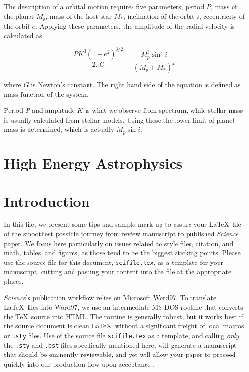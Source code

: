 \documentclass[12pt]{article}
\begin{document}
The description of a orbital motion requires five parameters, period $P$, mass of the planet $M_p$, mass of the host star $M_*$, inclination of the orbit $i$, eccentricity of the orbit $e$. Applying these parameters, the amplitude of the radial velocity is calculated as

\begin{equation}
\frac{P K^3(1-e^2)^{3/2}}{2\pi G} = \frac{M_p^3\sin^3 i}{(M_p+M_*)^2},
\end{equation}

where $G$ is Newton's constant. The right hand side of the equation is defined as mass function of the system.\cite{2013pss3.book..489W}

Period $P$ and amplitude $K$ is what we observe from spectrum, while stellar mass is usually calculated from stellar models. Using these the lower limit of planet mass is determined, which is actually $M_p\sin i$.


\section*{High Energy Astrophysics}













\section*{Introduction}

In this file, we present some tips and sample mark-up to assure your
\LaTeX\ file of the smoothest possible journey from review manuscript
to published {\it Science\/} paper.  We focus here particularly on
issues related to style files, citation, and math, tables, and
figures, as those tend to be the biggest sticking points.  Please use
the source file for this document, \texttt{scifile.tex}, as a template
for your manuscript, cutting and pasting your content into the file at
the appropriate places.

{\it Science\/}'s publication workflow relies on Microsoft Word97.  To
translate \LaTeX\ files into Word97, we use an intermediate MS-DOS
routine \cite{tth} that converts the \TeX\ source into HTML\@.  The
routine is generally robust, but it works best if the source document
is clean \LaTeX\ without a significant freight of local macros or
\texttt{.sty} files.  Use of the source file \texttt{scifile.tex} as a
template, and calling {\it only\/} the \texttt{.sty} and \texttt{.bst}
files specifically mentioned here, will generate a manuscript that
should be eminently reviewable, and yet will allow your paper to
proceed quickly into our production flow upon acceptance \cite{use2e}.
\end{document}
